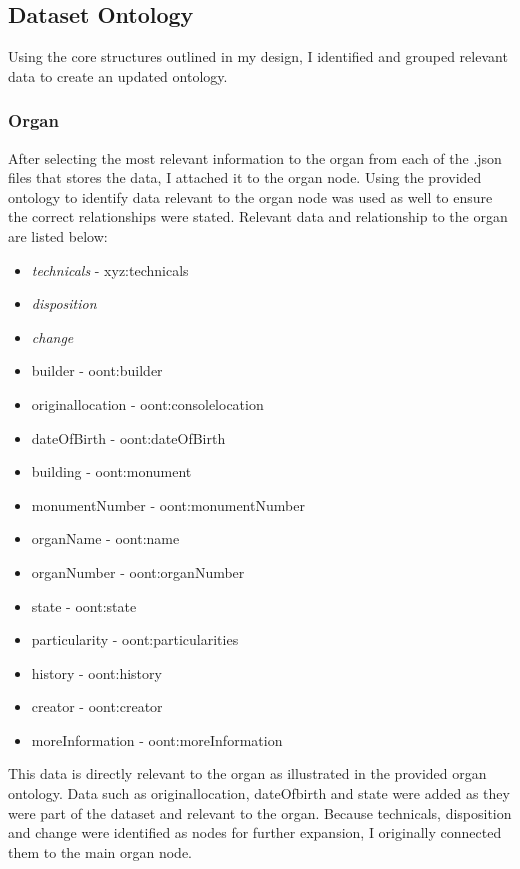 \subsection{Dataset Ontology}
\hspace*{0.5cm} Using the core structures outlined in my design, I identified and grouped relevant data to create an updated ontology. 

\subsubsection{Organ}
\hspace*{0.5cm} After selecting the most relevant information to the organ from each of the .json files that stores the data, I attached it to the organ node. Using the provided ontology to identify data relevant to the organ node was used as well to ensure the correct relationships were stated. Relevant data and relationship to the organ are listed below:

\begin{itemize}
    \itemsep0em 
    \item \textit{technicals} - xyz:technicals
    \item \textit{disposition}
    \item \textit{change}
    \item builder - oont:builder
    \item originallocation - oont:consolelocation
    \item dateOfBirth - oont:dateOfBirth
    \item building - oont:monument
    \item monumentNumber - oont:monumentNumber
    \item organName - oont:name
    \item organNumber - oont:organNumber 
    \item state - oont:state 
    \item particularity - oont:particularities
    \item history - oont:history
    \item creator - oont:creator
    \item moreInformation - oont:moreInformation 
\end{itemize}

This data is directly relevant to the organ as illustrated in the provided organ ontology. Data such as originallocation, dateOfbirth and state were added as they were part of the dataset and relevant to the organ. Because technicals, disposition and change were identified as nodes for further expansion, I originally connected them to the main organ node. 

